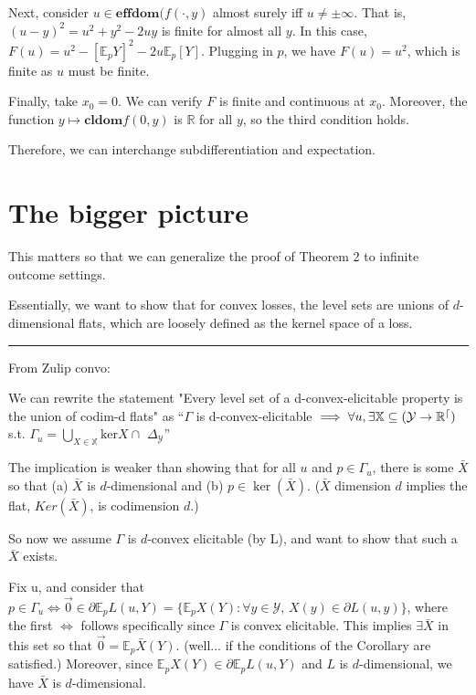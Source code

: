 \documentclass[12pt]{article}
\newcommand{\reals}{\mathbb{R}}
\newcommand{\E}{\mathbb{E}}
\newcommand{\cl}{\mathbf{cl}}
\newcommand{\dom}{\mathbf{dom}}
\newcommand{\effdom}{\mathbf{effdom}}
\begin{document}
Next, consider $u \in \effdom(f(\cdot, y)$ almost surely iff $u \neq \pm \infty$.
That is, $(u - y)^2 = u^2 + y^2 - 2uy$ is finite for almost all $y$.
In this case, $F(u) = u^2 - [\E_p Y]^2 -2 u \E_p [Y]$.
Plugging in $p$, we have $F(u) = u^2$, which is finite as $u$ must be finite.

Finally, take $x_0 = 0$.
We can verify $F$ is finite and continuous at $x_0$.
Moreover, the function $y \mapsto \cl \dom f(0, y)$ is $\reals$ for all $y$, so the third condition holds.

Therefore, we can interchange subdifferentiation and expectation. 


\section{The bigger picture}
This matters so that we can generalize the proof of Theorem 2 to infinite outcome settings.

Essentially, we want to show that for convex losses, the level sets are unions of $d$-dimensional flats, which are loosely defined as the kernel space of a loss.

\hrule
From Zulip convo:

We can rewrite the statement "Every level set of a d-convex-elicitable property is the union of codim-d flats" as 
``$\Gamma$ is d-convex-elicitable $\implies \forall u, \exists \mathbb X \subseteq  (\cal Y \to\mathbb{R}^d)$  s.t.  $\Gamma_u = \bigcup_{X \in \mathbb{X}} \mathrm{ker} X \cap \,\,\Delta_{\mathcal{Y}}$''

The implication is weaker than showing that for all $u$ and $p \in \Gamma_u$, there is some $\bar X$ so that (a) $\bar X$ is $d$-dimensional and (b) $p \in \ker( \bar X)$.  ($\bar X$ dimension $d$ implies the flat, $Ker(\bar X)$, is codimension $d$.)

So now we assume $\Gamma$ is $d$-convex elicitable (by L), and want to show that such a $\bar X$ exists.

Fix u, and consider that $p \in \Gamma_u \iff \vec 0 \in \partial \mathbb{E}_p L(u,Y) = \{\E_p X(Y) : \forall y \in \mathcal{Y}, \, X(y) \in \partial L(u,y) \}$, where the first $\iff$ follows specifically since $\Gamma$ is convex elicitable.  
This implies $\exists \bar X$ in this set so that $\vec 0 = \E_p \bar X(Y)$.  
(well... if the conditions of the Corollary are satisfied.)  
Moreover, since $\E_p X(Y) \in \partial \mathbb{E}_p L(u,Y)$ and $L$ is $d$-dimensional, we have $\bar X$ is $d$-dimensional.
\end{document}
